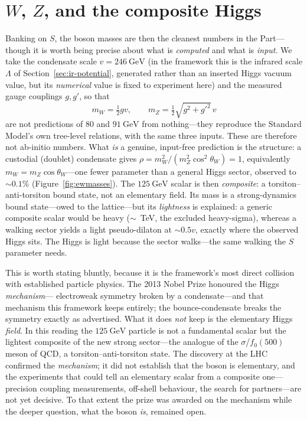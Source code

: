 \section{$W$, $Z$, and the composite Higgs}
\label{sec:wzh}

Banking on $S$, the boson masses are then the cleanest numbers in the Part---though it is worth
being precise about what is \emph{computed} and what is \emph{input}. We take the condensate scale
$v=246~\mathrm{GeV}$ (in the framework this is the infrared scale $\Lambda$ of
Section~\ref{sec:ir-potential}, generated rather than an inserted Higgs vacuum value, but its
\emph{numerical} value is fixed to experiment here) and the measured gauge couplings $g,g'$, so
that
\[
  m_W = \tfrac12 g v, \qquad m_Z = \tfrac12\sqrt{g^2+g'^2}\,v
\]
are not predictions of $80$ and $91~\mathrm{GeV}$ from nothing---they reproduce the Standard
Model's own tree-level relations, with the same three inputs. These are therefore not ab-initio
numbers. What \emph{is} a genuine, input-free prediction is the structure: a custodial (doublet)
condensate gives $\rho = m_W^2/(m_Z^2\cos^2\theta_W)=1$, equivalently $m_W=m_Z\cos\theta_W$---one
fewer parameter than a general Higgs sector, observed to $\sim0.1\%$ (Figure~\ref{fig:ewmasses}).
The $125~
\mathrm{GeV}$ scalar is then \emph{composite}: a torsiton--anti-torsiton bound state, not an
elementary field. Its mass is a strong-dynamics bound state---owed to the lattice---but its
\emph{lightness} is explained: a generic composite scalar would be heavy ($\sim$~TeV, the
excluded heavy-sigma), whereas a walking sector yields a light pseudo-dilaton at $\sim0.5v$,
exactly where the observed Higgs sits. The Higgs is light because the sector walks---the same
walking the $S$ parameter needs.

This is worth stating bluntly, because it is the framework's most direct collision with
established particle physics. The 2013 Nobel Prize honoured the Higgs \emph{mechanism}---
electroweak symmetry broken by a condensate---and that mechanism this framework keeps entirely;
the bounce-condensate breaks the symmetry exactly as advertised. What it does \emph{not} keep is
the elementary Higgs \emph{field}. In this reading the $125~\mathrm{GeV}$ particle is not a
fundamental scalar but the lightest composite of the new strong sector---the analogue of the
$\sigma$/$f_0(500)$ meson of QCD, a torsiton--anti-torsiton state. The discovery at the LHC
confirmed the \emph{mechanism}; it did not establish that the boson is elementary, and the
experiments that could tell an elementary scalar from a composite one---precision coupling
measurements, off-shell behaviour, the search for partners---are not yet decisive. To that
extent the prize was awarded on the mechanism while the deeper question, what the boson
\emph{is}, remained open.


